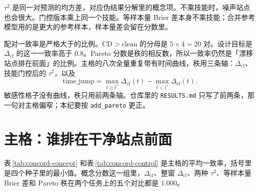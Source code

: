 \documentclass[11pt,a4paper,fontset=none]{ctexart}
\newcommand{\Dcf}{\ensuremath{\Delta_{\mathrm{cf}}}}
\begin{document}
\(\tau^{2}\) 是同一对预测的均方差，对应伪结果分解里的概念项。不乘技能时，噪声站点也会很大。门控版本乘上同一个技能。等样本量 Brier 差本身不乘技能；合并参考模型用的是更大的参考样本，样本量差会留在分数里。

配对一致率是严格大于的比例。\(\mathrm{CD}>\mathrm{clean}\) 的分母是 \(5\times 4=20\) 对。设计目标是 \(\Dcf\) 的这一一致率高于 \(0.8\)。Pareto 分数是秩的相反数，所以一致率仍然是「漂移站点排在前面」的比例。主格的八次全量重复带有时间曲线，秩用三条轴：\(\Dcf\)、技能门控后的 \(\tau^{2}\)，以及
\[
\mathrm{time\_jump}
=
\max_{t\ge t^{\ast}}\Dcf(t)
-
\max_{t<t^{\ast}}\Dcf(t).
\]
敏感性格子没有曲线，秩只用前两条轴。仓库里的 \texttt{RESULTS.md} 只写了前两条，那一句对主格偏窄；本纪要按 \texttt{add\_pareto} 更正。

\section{主格：谁排在干净站点前面}
\label{sec:main}

表\,\ref{tab:concord-concept} 和表\,\ref{tab:concord-control} 是主格的平均一致率，括号里是四个种子里的最小值。概念分数这一组里，\(\Dcf\)、整窗 \(\Dcf\)、两种 \(\tau^{2}\)、等样本量 Brier 差和 Pareto 秩在两个任务上的五个对比都是 \(1.000\)。
\end{document}
